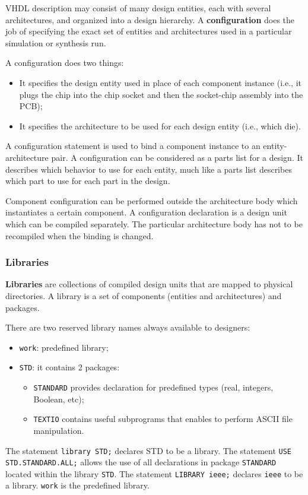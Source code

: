 \documentclass[a4paper,11pt]{article}
\begin{document}
VHDL description may consist of many design entities, each with several architectures, and organized into a design hierarchy.
A \textbf{configuration} does the job of specifying the exact set of entities and architectures used in a particular simulation or synthesis run.

A configuration does two things:
\begin{itemize}
	\item It specifies the design entity used in place of each
	      component instance (i.e., it plugs the chip into the chip
	      socket and then the socket-chip assembly into the
	      PCB);
	\item It specifies the architecture to be used for each design
	      entity (i.e., which die).
\end{itemize}

A configuration statement is used to bind a component instance
to an entity-architecture pair. A configuration can be considered
as a parts list for a design. It describes which behavior to use for
each entity, much like a parts list describes which part to use for
each part in the design.

Component configuration can be performed outside the
architecture body which instantiates a certain component.
A configuration declaration is a design unit which can be
compiled separately.
The particular architecture body has not to be recompiled when
the binding is changed.

\subsubsection{Libraries}

\textbf{Libraries} are collections of compiled design units that are mapped to
physical directories. A library is a set of components (entities and
architectures) and packages.

There are two reserved library names always available to designers:
\begin{itemize}
	\item \texttt{work}: predefined library;
	\item \texttt{STD}: it contains 2 packages:
	      \begin{itemize}
		      \item \texttt{STANDARD} provides declaration for predefined types (real, integers, Boolean, etc);
		      \item \texttt{TEXTIO} contains useful subprograms that enables to perform ASCII file manipulation.
	      \end{itemize}
\end{itemize}

The statement \lstinline|library STD;| declares STD to be a library.
The statement \lstinline|USE STD.STANDARD.ALL;| allows the use of all declarations in package \texttt{STANDARD} located within the library \texttt{STD}.
The statement \lstinline|LIBRARY ieee;| declares \texttt{ieee} to be a library. \texttt{work} is the predefined library.
\end{document}
